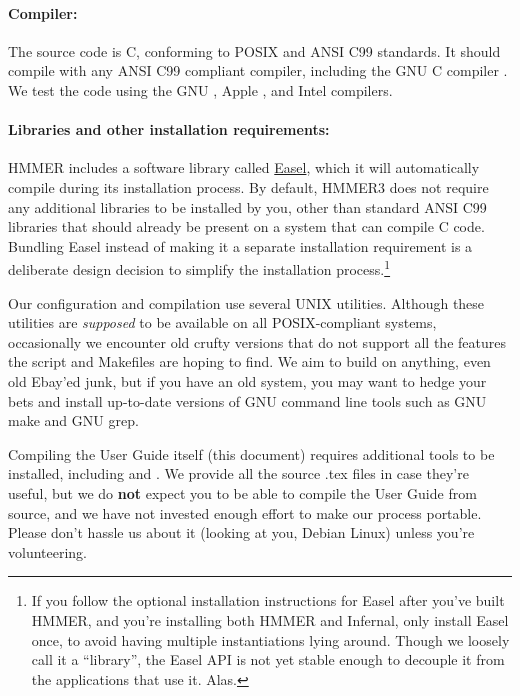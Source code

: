 \paragraph{Compiler:} The source code is C, conforming to POSIX and ANSI
C99 standards. It should compile with any ANSI C99 compliant compiler,
including the GNU C compiler . We test the code using the
GNU , Apple , and Intel 
compilers.


\paragraph{Libraries and other installation requirements:} HMMER includes
a software library called \href{http://bioeasel.org}{Easel}, which it
will automatically compile during its installation process.  By
default, HMMER3 does not require any additional libraries to be
installed by you, other than standard ANSI C99 libraries that should
already be present on a system that can compile C code. Bundling Easel
instead of making it a separate installation requirement is a
deliberate design decision to simplify the installation
process.\footnote{If you follow the optional installation instructions
  for Easel after you've built HMMER, and you're installing both HMMER
  and Infernal, only install Easel once, to avoid having multiple
  instantiations lying around. Though we loosely call it a
  ``library'', the Easel API is not yet stable enough to decouple it
  from the applications that use it. Alas.}

Our configuration and compilation use several UNIX utilities. Although
these utilities are \emph{supposed} to be available on all
POSIX-compliant systems, occasionally we encounter old crufty versions
that do not support all the features the  script
and Makefiles are hoping to find. We aim to build on anything, even
old Ebay'ed junk, but if you have an old system, you may want to hedge
your bets and install up-to-date versions of GNU command line tools
such as GNU make and GNU grep.

Compiling the User Guide itself (this document) requires additional
tools to be installed, including  and . We
provide all the source .tex files in case they're useful, but we do
\textbf{not} expect you to be able to compile the User Guide from
source, and we have not invested enough effort to make our process
portable.  Please don't hassle us about it (looking at you, Debian
Linux) unless you're volunteering.


